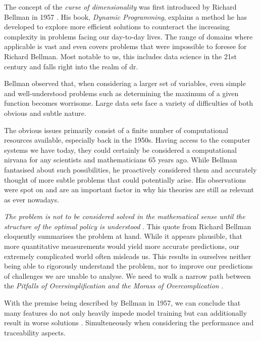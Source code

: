 The concept of the \emph{curse of dimensionality} was first introduced by Richard Bellman in 1957 \cite{DynProg}.
His book, \emph{Dynamic Programming}, explains a method he has developed to explore more efficient solutions to counteract the increasing complexity in problems facing our day-to-day lives. 
The range of domains where applicable is vast and even covers problems that were impossible to foresee for Richard Bellman.
Most notable to us, this includes data science in the 21st century and falls right into the realm of \acrlong{dr}.
\bigskip

Bellman observed that, when considering a larger set of variables, even simple and well-understood problems such as determining the maximum of a given function becomes worrisome.
Large data sets face a variety of difficulties of both obvious and subtle nature.

The obvious issues primarily consist of a finite number of computational resources available, especially back in the 1950s. 
Having access to the computer systems we have today, they could certainly be considered a computational nirvana for any scientists and mathematicians 65 years ago.
While Bellman fantasised about such possibilities, he proactively considered them and accurately thought of more subtle problems that could potentially arise.
His observations were spot on and are an important factor in why his theories are still as relevant as ever nowadays.

\emph{The problem is not to be considered solved in the mathematical sense until the structure of the optimal policy is understood} \cite{DynProg}.
This quote from Richard Bellman eloquently summarises the problem at hand.  
While it appears plausible, that more quantitative measurements would yield more accurate predictions, our extremely complicated world often misleads us.
This results in ourselves neither being able to rigorously understand the problem, nor to improve our predictions of challenges we are unable to analyse.
We need to walk a narrow path between the \emph{Pitfalls of Oversimplification and the Morass of Overcomplication} .
\bigskip

With the premise being described by Bellman in 1957, we can conclude that many features do not only heavily impede model training but can additionally result in worse solutions \cite{HandsOnMLCh8}.
Simulteneously when considering the performance and traceability aspects.

